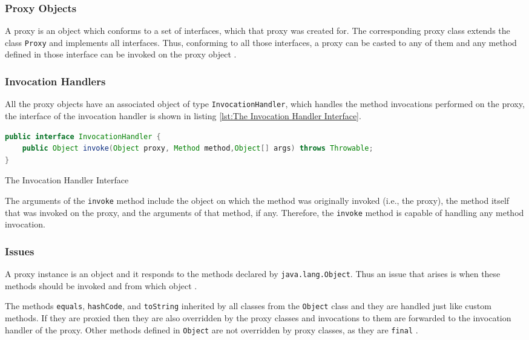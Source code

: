 \subsubsection{Proxy Objects}\label{Proxy Objects}
A proxy is an object which conforms to a set of interfaces, which that proxy was created for. 
The corresponding proxy class extends the class \texttt{Proxy} and implements all interfaces.
Thus, conforming to all those interfaces, a proxy can be casted to any of them and any method defined in those interface can be invoked on the proxy object \cite{eugster2006uniform}.

\subsubsection{Invocation Handlers}\label{Invocation Handlers}
All the proxy objects have an associated object of type \texttt{InvocationHandler}, which handles the method invocations performed on the proxy, the interface of the invocation handler is shown in listing \ref{lst:The Invocation Handler Interface}.

\begin{sourcecode}
	\label{lst:The Invocation Handler Interface}
	\begin{lstlisting}[language=Java]
public interface InvocationHandler {
	public Object invoke(Object proxy, Method method,Object[] args) throws Throwable;
}		
	\end{lstlisting}
	\caption{The Invocation Handler Interface}
\end{sourcecode}

The arguments of the \texttt{invoke} method include the object on which the method was originally invoked (i.e., the proxy), the method itself that was invoked on the proxy, and the arguments of that method, if any.
Therefore, the \texttt{invoke} method is capable of handling any method invocation.

\subsubsection{Issues}\label{Dynamic Proxies Issues}
A proxy instance is an object and it responds to the methods declared by \texttt{java.lang.Object}. 
Thus an issue that arises is when these methods should be invoked and from which object \cite{forman2004java}.

The methods \texttt{equals}, \texttt{hashCode}, and \texttt{toString} inherited by all classes from the \texttt{Object} class and they are handled just like custom methods.
If they are proxied then they are also overridden by the proxy classes and invocations to them are forwarded to the invocation handler of the proxy. 
Other methods defined in \texttt{Object} are not overridden by proxy classes, as they are \texttt{final} \cite{eugster2006uniform}.

